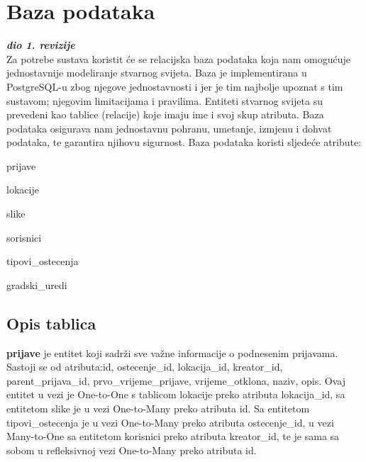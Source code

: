 	
		

		

				
		\section{Baza podataka}
			
			\textbf{\textit{dio 1. revizije}}\\
			
		Za potrebe sustava koristit će se relacijska baza podataka koja nam omogućuje jednostavnije modeliranje stvarnog svijeta. Baza je implementirana u PostgreSQL-u zbog njegove jednostavnosti i jer je tim najbolje upoznat s tim sustavom; njegovim limitacijama i pravilima. Entiteti stvarnog svijeta su prevedeni kao tablice (relacije) koje imaju ime i svoj skup atributa. Baza podataka osigurava nam jednostavnu pohranu, umetanje, izmjenu i dohvat podataka, te garantira njihovu sigurnost. Baza podataka koristi sljedeće atribute:
		\begin{packed_item}
		\setlength\itemindent{24pt}
		\item prijave
		\item lokacije
		\item slike
		\item sorisnici
		\item tipovi{\_}ostecenja
		\item gradski{\_}uredi
		\end{packed_item}
		
		
			\subsection{Opis tablica}
			

				\textbf{prijave} je entitet koji sadrži sve važne informacije o podnesenim prijavama. Sastoji se od atributa:id, ostecenje{\_}id, lokacija{\_}id, kreator{\_}id, parent{\_}prijava{\_}id, prvo{\_}vrijeme{\_}prijave,
vrijeme{\_}otklona, naziv, opis. Ovaj entitet u vezi je One-to-One s tablicom lokacije preko atributa lokacija{\_}id, sa entitetom slike je u vezi One-to-Many preko atributa id. Sa entitetom tipovi{\_}ostecenja je u vezi One-to-Many preko atributa ostecenje{\_}id, u vezi Many-to-One sa entitetom korisnici preko atributa kreator{\_}id, te je sama sa sobom u refleksivnoj vezi One-to-Many preko atributa id.\\
				

